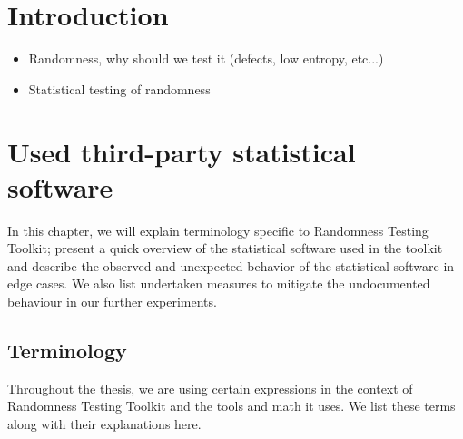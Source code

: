 \documentclass[
  digital,  	%
  color,		%
  oneside,   	%
  12pt,
  nocover,
  notable,
  nolof,
  nolot,
]{fithesis3}
\begin{document}
\chapter{Introduction}
\begin{itemize}
\item Randomness, why should we test it (defects, low entropy, etc...)
\item Statistical testing of randomness
\end{itemize}

\chapter{Used third-party statistical software}
\label{chap:batteries}
In this chapter, we will explain terminology specific to Randomness Testing Toolkit; present a quick overview of the statistical software used in the toolkit and describe the observed and unexpected behavior of the statistical software in edge cases. We also list undertaken measures to mitigate the undocumented behaviour in our further experiments.

\section{Terminology}
Throughout the thesis, we are using certain expressions in the context of Randomness Testing Toolkit and the tools and math it uses. We list these terms along with their explanations here.
\end{document}
